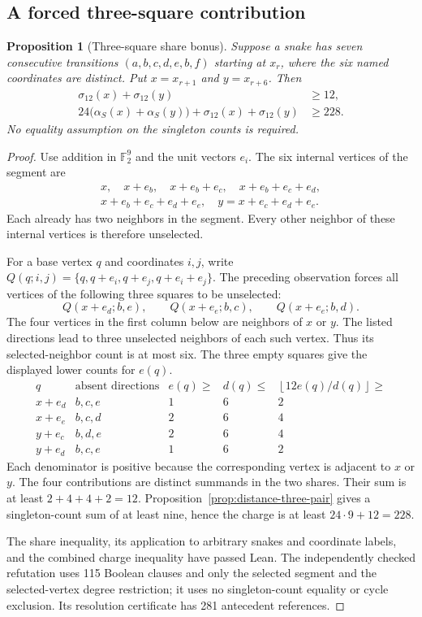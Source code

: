 \documentclass[11pt,a4paper]{article}
\newtheorem{proposition}[theorem]{Proposition}
\theoremstyle{definition}
\theoremstyle{remark}
\begin{document}
\subsection{A forced three-square contribution}
\begin{proposition}[Three-square share bonus]\label{prop:three-square-bonus}
Suppose a snake has seven consecutive transitions $(a,b,c,d,e,b,f)$ starting at $x_r$, where the six named coordinates are distinct. Put $x=x_{r+1}$ and $y=x_{r+6}$. Then
\[
\begin{aligned}
\sigma_{12}(x)+\sigma_{12}(y)&\ge12,\\
24\bigl(\alpha_S(x)+\alpha_S(y)\bigr)+\sigma_{12}(x)+\sigma_{12}(y)&\ge228.
\end{aligned}
\]
No equality assumption on the singleton counts is required.
\end{proposition}
\begin{proof}
Use addition in $\mathbb F_2^9$ and the unit vectors $e_i$. The six internal vertices of the segment are
\[
\begin{gathered}
x,\quad x+e_b,\quad x+e_b+e_c,\quad x+e_b+e_c+e_d,\\
x+e_b+e_c+e_d+e_e,\quad y=x+e_c+e_d+e_e.
\end{gathered}
\]
Each already has two neighbors in the segment. Every other neighbor of these internal vertices is therefore unselected.

For a base vertex $q$ and coordinates $i,j$, write
$Q(q;i,j)=\{q,q+e_i,q+e_j,q+e_i+e_j\}$.
The preceding observation forces all vertices of the following three squares to be unselected:
\[
Q(x+e_d;b,e),\qquad Q(x+e_e;b,c),\qquad Q(x+e_e;b,d).
\]
The four vertices in the first column below are neighbors of $x$ or $y$. The listed directions lead to three unselected neighbors of each such vertex. Thus its selected-neighbor count is at most six. The three empty squares give the displayed lower counts for $e(q)$.
\[
\begin{array}{c|c|c|c|c}
q&\text{absent directions}&e(q)\ge&d(q)\le&
\left\lfloor12e(q)/d(q)\right\rfloor\ge\\\hline
x+e_d&b,c,e&1&6&2\\
x+e_e&b,c,d&2&6&4\\
y+e_c&b,d,e&2&6&4\\
y+e_d&b,c,e&1&6&2
\end{array}
\]
Each denominator is positive because the corresponding vertex is adjacent to $x$ or $y$. The four contributions are distinct summands in the two shares. Their sum is at least $2+4+4+2=12$. Proposition~\ref{prop:distance-three-pair} gives a singleton-count sum of at least nine, hence the charge is at least $24\cdot9+12=228$.

The share inequality, its application to arbitrary snakes and coordinate labels, and the combined charge inequality have passed Lean. The independently checked refutation uses 115 Boolean clauses and only the selected segment and the selected-vertex degree restriction; it uses no singleton-count equality or cycle exclusion. Its resolution certificate has 281 antecedent references.
\end{proof}
\end{document}
